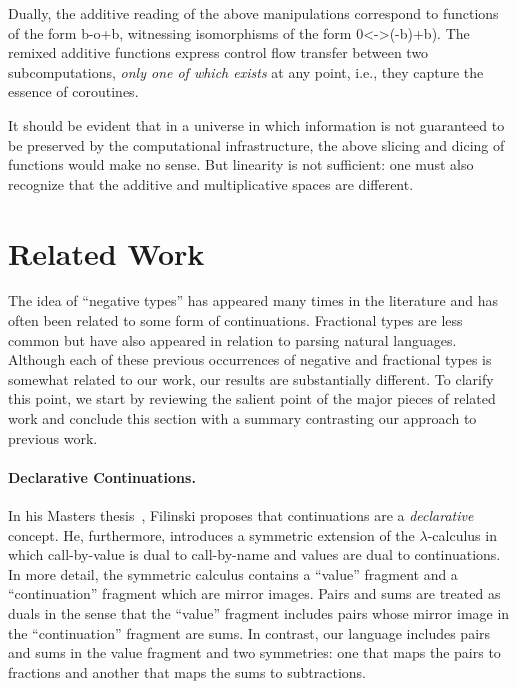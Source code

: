 \documentclass[preprint]{sigplanconf}
\begin{document}
Dually, the additive reading of the above manipulations correspond to
functions of the form {{b-o+b}}, witnessing isomorphisms of the form
{{0<->(-b)+b}}). The remixed additive functions express control flow transfer
between two subcomputations, \emph{only one of which exists} at any point,
i.e., they capture the essence of coroutines. 

It should be evident that in a universe in which information is not
guaranteed to be preserved by the computational infrastructure, the above
slicing and dicing of functions would make no sense. But linearity is not
sufficient: one must also recognize that the additive and multiplicative
spaces are different. 

\section{Related Work} 
\label{sec:related}

The idea of ``negative types'' has appeared many times in the literature and
has often been related to some form of continuations. Fractional types are
less common but have also appeared in relation to parsing natural
languages. Although each of these previous occurrences of negative and
fractional types is somewhat related to our work, our results are
substantially different. To clarify this point, we start by reviewing the
salient point of the major pieces of related work and conclude this section
with a summary contrasting our approach to previous work.

\paragraph*{Declarative Continuations.} 
In his Masters thesis~\cite{Filinski:1989:DCI:648332.755574}, Filinski
proposes that continuations are a \emph{declarative} concept. He,
furthermore, introduces a symmetric extension of the $\lambda$-calculus in
which call-by-value is dual to call-by-name and values are dual to
continuations. In more detail, the symmetric calculus contains a ``value''
fragment and a ``continuation'' fragment which are mirror images. Pairs and
sums are treated as duals in the sense that the ``value'' fragment includes
pairs whose mirror image in the ``continuation'' fragment are sums. In
contrast, our language includes pairs and sums in the value fragment and two
symmetries: one that maps the pairs to fractions and another that maps the
sums to subtractions.
\end{document}
